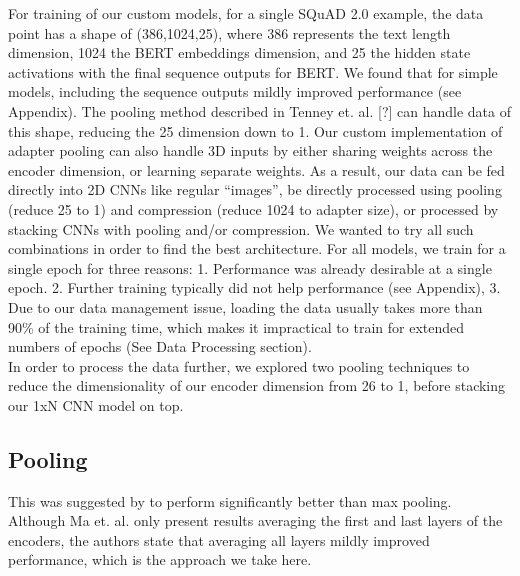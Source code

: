 For training of our custom models, for a single SQuAD 2.0 example, the data point has a shape of (386,1024,25), where 386 represents the text length dimension, 1024 the BERT embeddings dimension, and 25 the hidden state activations with the final sequence outputs for BERT. We found that for simple models, including the sequence outputs mildly improved performance (see Appendix). The pooling method described in Tenney et. al. [?] can handle data of this shape, reducing the 25 dimension down to 1. Our custom implementation of adapter pooling can also handle 3D inputs by either sharing weights across the encoder dimension, or learning separate weights. As a result, our data can be fed directly into 2D CNNs like regular “images”, be directly processed using pooling (reduce 25 to 1) and compression (reduce 1024 to adapter size), or processed by stacking CNNs with pooling and/or compression. We wanted to try all such combinations in order to find the best architecture. For all models, we train for a single epoch for three reasons: 1. Performance was already desirable at a single epoch. 2. Further training typically did not help performance (see Appendix), 3. Due to our data management issue, loading the data usually takes more than 90\% of the training time, which makes it impractical to train for extended numbers of epochs (See Data Processing section). \\

In order to process the data further, we explored two pooling techniques to reduce the dimensionality of our encoder dimension from 26 to 1, before stacking our 1xN CNN model on top. \\

\subsection{Pooling} 
This was suggested by \cite{ma2019universal} to perform significantly better than max pooling. Although Ma et. al. only present results averaging the first and last layers of the encoders, the authors state that averaging all layers mildly improved performance, which is the approach we take here. \\

